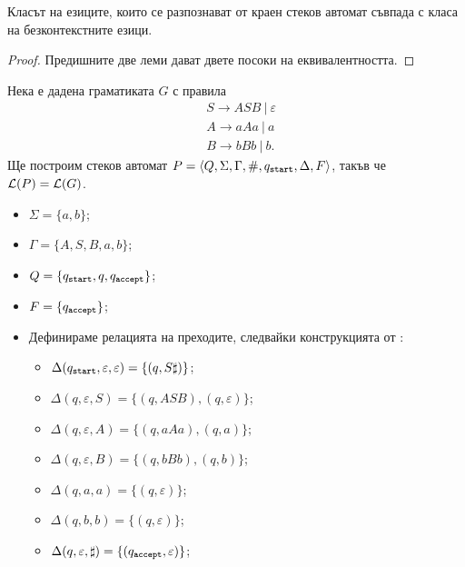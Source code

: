   
\begin{framed}
\begin{thm}
  \label{th:push-down-context-free}
  Класът на езиците, които се разпознават от краен стеков автомат съвпада с
  класа на безконтекстните езици.
\end{thm}
\end{framed}
\begin{proof}
  Предишните две леми дават двете посоки на еквивалентността.
\end{proof}

\begin{example}
  Нека е дадена граматиката $G$ с правила 
  \begin{align*}
    & S \to ASB\ |\ \varepsilon\\
    & A \to aAa\ |\ a\\
    & B \to bBb\ |\ b.
  \end{align*}
  Ще построим стеков автомат $P = \langle{Q,\Sigma,\Gamma,\#,q_{\texttt{start}},\Delta,F}\rangle$, такъв че $\mathcal{L}(P) = \mathcal{L}(G)$.
  \begin{itemize}
  \item
    $\Sigma = \{a,b\}$;
  \item 
    $\Gamma = \{A,S,B,a,b\}$;
  \item
    $Q = \{q_{\texttt{start}},q,q_{\texttt{accept}}\}$;
  \item
    $F = \{q_{\texttt{accept}}\}$;
  \item
    Дефинираме релацията на преходите, следвайки конструкцията от :
    \begin{itemize}
    \item
      $\Delta(q_{\texttt{start}},\varepsilon,\varepsilon) = \{(q,S\sharp)\}$;
    \item 
      $\Delta(q,\varepsilon, S) = \{(q,ASB), (q,\varepsilon)\}$;
    \item
      $\Delta(q, \varepsilon, A) = \{(q, aAa), (q, a)\}$;
    \item
      $\Delta(q, \varepsilon, B) = \{(q, bBb), (q, b)\}$;
    \item
      $\Delta(q, a, a) = \{(q,\varepsilon)\}$;
    \item
      $\Delta(q, b, b) = \{(q,\varepsilon)\}$;
    \item
      $\Delta(q, \varepsilon, \sharp) = \{ (q_{\texttt{accept}},\varepsilon)\}$;
    \end{itemize}
  \end{itemize}
\end{example}


